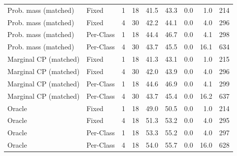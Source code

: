 \begin{tabular}{llrrrrrrr}
Prob. mass (matched) & Fixed & 1 & 18 & 41.5 & 43.3 & 0.0 & 1.0 & 214 \\
Prob. mass (matched) & Fixed & 4 & 30 & 42.2 & 44.1 & 0.0 & 4.0 & 296 \\
Prob. mass (matched) & Per-Class & 1 & 18 & 44.4 & 46.7 & 0.0 & 4.1 & 298 \\
Prob. mass (matched) & Per-Class & 4 & 30 & 43.7 & 45.5 & 0.0 & 16.1 & 634 \\
Marginal CP (matched) & Fixed & 1 & 18 & 41.3 & 43.1 & 0.0 & 1.0 & 215 \\
Marginal CP (matched) & Fixed & 4 & 30 & 42.0 & 43.9 & 0.0 & 4.0 & 296 \\
Marginal CP (matched) & Per-Class & 1 & 18 & 44.6 & 46.9 & 0.0 & 4.1 & 299 \\
Marginal CP (matched) & Per-Class & 4 & 30 & 43.7 & 45.4 & 0.0 & 16.2 & 637 \\
Oracle & Fixed & 1 & 18 & 49.0 & 50.5 & 0.0 & 1.0 & 214 \\
Oracle & Fixed & 4 & 18 & 51.3 & 53.2 & 0.0 & 4.0 & 295 \\
Oracle & Per-Class & 1 & 18 & 53.3 & 55.2 & 0.0 & 4.0 & 297 \\
Oracle & Per-Class & 4 & 18 & 54.0 & 55.7 & 0.0 & 16.0 & 628 \\
\bottomrule
\end{tabular}
